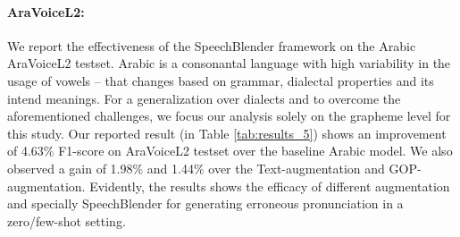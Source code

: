 \documentclass{INTERSPEECH2023}
\begin{document}
\paragraph*{AraVoiceL2:} We report the effectiveness of the SpeechBlender framework on the Arabic AraVoiceL2 testset. Arabic is a consonantal language with high variability in the usage of vowels -- that changes based on grammar, dialectal properties and its intend meanings. For a generalization over dialects and to overcome the aforementioned challenges, we focus our analysis solely on the grapheme level for this study. Our reported result (in Table \ref{tab:results_5}) shows an improvement of 4.63\% F1-score on AraVoiceL2 testset over the baseline Arabic model. 
We also observed a gain of 1.98\% and 1.44\% over the Text-augmentation and GOP-augmentation.
Evidently, the results shows the efficacy of different augmentation and specially SpeechBlender for generating erroneous pronunciation in a zero/few-shot setting. 








\begin{table} [!ht]
\centering
{}
\caption{Reported Grapheme-Level Precision, Recall and F1-score on AraVoiceL2 testset}
\vspace{-0.6cm}
\label{tab:results_5}
\end{table}
\end{document}
